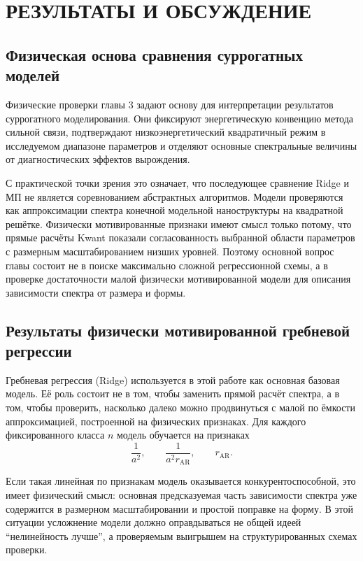 \chapter{РЕЗУЛЬТАТЫ И ОБСУЖДЕНИЕ}

\section{Физическая основа сравнения суррогатных моделей}

Физические проверки главы 3 задают основу для интерпретации результатов суррогатного
моделирования. Они фиксируют энергетическую конвенцию метода сильной связи, подтверждают
низкоэнергетический квадратичный режим в исследуемом диапазоне параметров и отделяют
основные спектральные величины от диагностических эффектов вырождения.

С практической точки зрения это означает, что последующее сравнение Ridge и МП не является
соревнованием абстрактных алгоритмов. Модели проверяются как аппроксимации спектра
конечной модельной наноструктуры на квадратной решётке. Физически мотивированные признаки
имеют смысл только потому, что прямые расчёты Kwant показали согласованность выбранной
области параметров с размерным масштабированием низших уровней. Поэтому основной вопрос
главы состоит не в поиске максимально сложной регрессионной схемы, а в проверке
достаточности малой физически мотивированной модели для описания зависимости спектра от
размера и формы.

\section{Результаты физически мотивированной гребневой регрессии}

Гребневая регрессия (Ridge) используется в этой работе как основная базовая модель. Её
роль состоит не в том, чтобы заменить прямой расчёт спектра, а в том, чтобы проверить,
насколько далеко можно продвинуться с малой по ёмкости аппроксимацией, построенной на
физических признаках. Для каждого фиксированного класса $n$ модель обучается на признаках
\[
  \frac{1}{a^2}, \qquad
  \frac{1}{a^2 r_{\mathrm{AR}}}, \qquad
  r_{\mathrm{AR}} .
\]

Если такая линейная по признакам модель оказывается конкурентоспособной, это имеет
физический смысл: основная предсказуемая часть зависимости спектра уже содержится в
размерном масштабировании и простой поправке на форму. В этой ситуации усложнение модели
должно оправдываться не общей идеей ``нелинейность лучше'', а проверяемым выигрышем на
структурированных схемах проверки.

